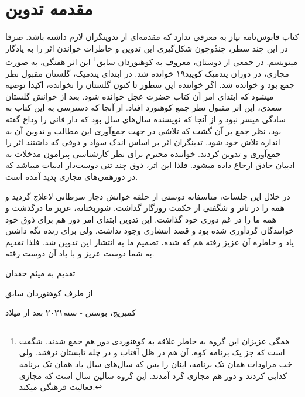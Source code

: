 \section*{مقدمه تدوین} 
کتاب قابوس‌نامه نیاز به معرفی ندارد که مقدمه‌ای از تدوینگران لازم داشته باشد. صرفا در این چند سطر، چندُ‌و‌چون شکل‌گیری این تدوین و خاطرات خواندن اثر را به یادگار مینویسم. در جمعی از دوستان، معروف به کوهنوردان سابق\footnote{همگی عزیزان این گروه به خاطر علاقه به کوهنوردی دور هم جمع شدند. شگفت است که جز یک برنامه کوه، آن هم در ظل آفتاب و در چله تابستان نرفتند. ولی خب مراودات همان تک برنامه، اینان را بس که سال‌های سال یاد همان تک برنامه کذایی کردند و دور هم مجازی گرد آمدند. این گروه سالین سال است که مجازی فعالیت فرهنگی میکند. } این اثر هفنگی، به صورت مجازی، در دوران پندمیک کویید۱۹ خوانده شد. 
در ابتدای پندمیک، گلستان مقبول نظر جمع بود و خوانده شد. اگر خواننده این سطور تا کنون گلستان را نخوانده، اکیدا توصیه میشود که ابتدای امر آن کتاب حضرت عجل خوانده شود. بعد از خوانش گلستان سعدی، این اثر مقبول نظر جمع کوهنورد افتاد. از آنجا که دسترسی به این کتاب به سادگی میسر نبود و از آنجا که نویسنده سال‌های سال بود که دار فانی را وداع گفته بود، نظر جمع بر آن گشت که تلاشی در جهت جمع‌آوری این مطالب و تدوین آن به اندازه تلاش 
خود شود. تدینگران اثر بر اساس اندک سواد و ذوقی که داشتند اثر را جمع‌آوری و تدوین کردند. خواننده محترم برای نظر کارشناسی پیرامون مدخلات به ادیبان حاذق ارجاع داده میشود. فلذا این اثر، ذوق چند تنی دوست‌دار ادبیات میباشد که در دور‌همی‌های مجازی پدید آمده است. 

در خلال این جلسات، متاسفانه دوستی از حلقه خوانش دچار سرطانی لاعلاج گردید و همه را در تاثر و شگفتی از حکمت روزگار گذاشت. شوربختانه، عزیز ما درگذشت و همه ما را در غم دوری خود گذاشت. این تدوین ابتدای امر دور هم برای ذوق خود خوانندگان گردآوری شده بود و قصد انتشاری وجود نداشت. ولی برای زنده نگه داشتن یاد و خاطره آن عزیز رفته هم که شده،‌ تصمیم ما به انتشار این تدوین شد. فلذا تقدیم به شما دوست عزیز و با یاد آن دوست رفته.

\hfill{تقدیم به میثم حقدان}

\hfill{از طرف کوهنوردان سابق}

\hfill{کمبریج، بوستن - سنه۲۰۲۱ بعد از میلاد}

\newpage